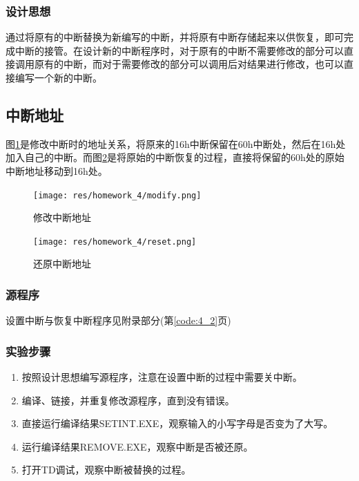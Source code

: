 \documentclass{article}
\begin{document}
	\subsubsection{设计思想}
	通过将原有的中断替换为新编写的中断，并将原有中断存储起来以供恢复，即可完成中断的接管。在设计新的中断程序时，对于原有的中断不需要修改的部分可以直接调用原有的中断，而对于需要修改的部分可以调用后对结果进行修改，也可以直接编写一个新的中断。

	\subsection{中断地址}
	图\ref{fig:modify}是修改中断时的地址关系，将原来的16h中断保留在60h中断处，然后在16h处加入自己的中断。而图\ref{fig:reset}是将原始的中断恢复的过程，直接将保留的60h处的原始中断地址移动到16h处。\par
	\begin{minipage}{0.59\textwidth}
		\begin{figure}[H]
			\centering
			\texttt{[image: res/homework\_4/modify.png]}
			\caption{修改中断地址}
			\label{fig:modify}
		\end{figure}
	\end{minipage}
	\hfill
	\begin{minipage}{0.39\textwidth}
		\begin{figure}[H]
			\centering
			\texttt{[image: res/homework\_4/reset.png]}
			\caption{还原中断地址}
			\label{fig:reset}
		\end{figure}
	\end{minipage}

	\subsubsection{源程序}
	设置中断与恢复中断程序见附录部分(第\ref{code:4_2}页)

	\subsubsection{实验步骤}
	\begin{enumerate}
		\item 按照设计思想编写源程序，注意在设置中断的过程中需要关中断。
		\item 编译、链接，并重复修改源程序，直到没有错误。
		\item 直接运行编译结果SETINT.EXE，观察输入的小写字母是否变为了大写。
		\item 运行编译结果REMOVE.EXE，观察中断是否被还原。
		\item 打开TD调试，观察中断被替换的过程。
	\end{enumerate}
\end{document}
